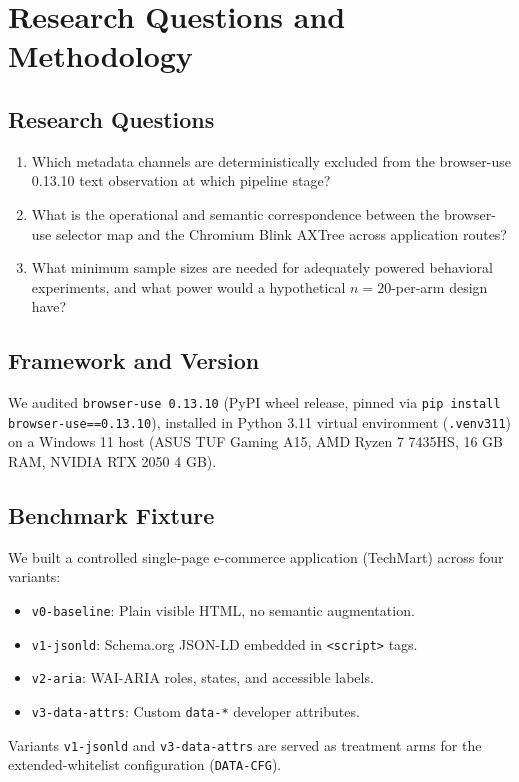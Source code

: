 \documentclass[conference]{IEEEtran}
\begin{document}
\section{Research Questions and Methodology}
\label{sec:rqs}

\subsection{Research Questions}
\begin{enumerate}
    \item[\textbf{RQ1}] Which metadata channels are deterministically excluded from the browser-use 0.13.10 text observation at which pipeline stage?
    \item[\textbf{RQ2}] What is the operational and semantic correspondence between the browser-use selector map and the Chromium Blink AXTree across application routes?
    \item[\textbf{RQ3}] What minimum sample sizes are needed for adequately powered behavioral experiments, and what power would a hypothetical $n=20$-per-arm design have?
\end{enumerate}

\subsection{Framework and Version}
We audited \texttt{browser-use 0.13.10} (PyPI wheel release, pinned via \texttt{pip install browser-use==0.13.10}), installed in Python 3.11 virtual environment (\texttt{.venv311}) on a Windows 11 host (ASUS TUF Gaming A15, AMD Ryzen 7 7435HS, 16 GB RAM, NVIDIA RTX 2050 4 GB).

\subsection{Benchmark Fixture}
We built a controlled single-page e-commerce application (TechMart) across four variants:
\begin{itemize}
    \item \texttt{v0-baseline}: Plain visible HTML, no semantic augmentation.
    \item \texttt{v1-jsonld}: Schema.org JSON-LD embedded in \texttt{<script>} tags.
    \item \texttt{v2-aria}: WAI-ARIA roles, states, and accessible labels.
    \item \texttt{v3-data-attrs}: Custom \texttt{data-*} developer attributes.
\end{itemize}
Variants \texttt{v1-jsonld} and \texttt{v3-data-attrs} are served as treatment arms for the extended-whitelist configuration (\texttt{DATA-CFG}).
\end{document}

